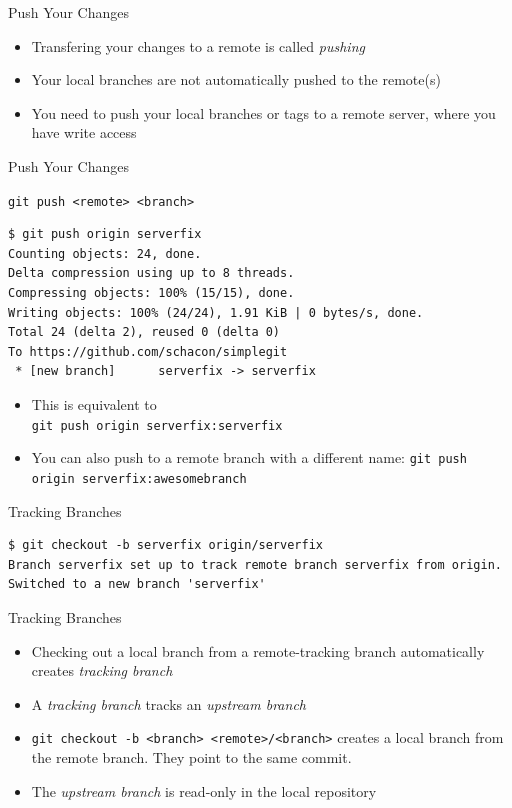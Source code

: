 \documentclass[aspectratio=169]{beamer}
\renewcommand{\footnotesize}{\tiny}
\newcommand{\sectiontitle}{}
\begin{document}
\begin{frame}[fragile]{Push Your Changes}{\sectiontitle}
\begin{itemize}
    \item Transfering your changes to a remote is called \emph{pushing}
    \item Your local branches are not automatically pushed to the remote(s)
    \item You need to push your local branches or tags to a remote server, where you have write access
\end{itemize}
\end{frame}

\begin{frame}[fragile]{Push Your Changes}{\sectiontitle}
\begin{block}{\texttt{git push <remote> <branch>}}
\begin{verbatim}
$ git push origin serverfix
Counting objects: 24, done.
Delta compression using up to 8 threads.
Compressing objects: 100% (15/15), done.
Writing objects: 100% (24/24), 1.91 KiB | 0 bytes/s, done.
Total 24 (delta 2), reused 0 (delta 0)
To https://github.com/schacon/simplegit
 * [new branch]      serverfix -> serverfix
\end{verbatim}
\begin{itemize}
    \item This is equivalent to \\
          \verb|git push origin serverfix:serverfix|
    \item You can also push to a remote branch with a different name:
          \verb|git push origin serverfix:awesomebranch|
\end{itemize}
\end{block}
\end{frame}

\begin{frame}[fragile]{Tracking Branches}{\sectiontitle}
\begin{verbatim}
$ git checkout -b serverfix origin/serverfix
Branch serverfix set up to track remote branch serverfix from origin.
Switched to a new branch 'serverfix'
\end{verbatim}
\begin{block}{Tracking Branches}
\begin{itemize}
    \item Checking out a local branch from a remote-tracking branch
          automatically creates \emph{tracking branch}
    \item A \emph{tracking branch} tracks an \emph{upstream branch}
    \item \verb|git checkout -b <branch> <remote>/<branch>| creates a local
          branch from the remote branch. They point to the same commit.
    \item The \emph{upstream branch} is read-only in the local repository
\end{itemize}
\end{block}
\end{frame}
\end{document}

